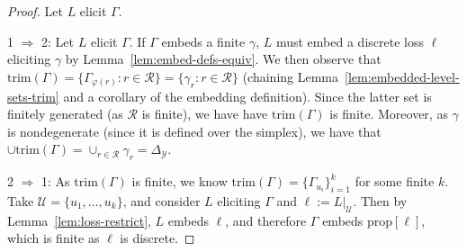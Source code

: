 \documentclass[12pt]{article}
\newcommand{\Comments}{1}
\newcommand{\mynote}[2]{\ifnum\Comments=1\textcolor{#1}{#2}\fi}
\newcommand{\jessie}[1]{\mynote{purple}{[JF: #1]}}
\newcommand{\reals}{\mathbb{R}}
\newcommand{\prop}[1]{\mathrm{prop}[#1]}
\newcommand{\simplex}{\Delta_\Y}
\newcommand{\R}{\mathcal{R}}
\newcommand{\U}{\mathcal{U}}
\newcommand{\Y}{\mathcal{Y}}
\newcommand{\risk}[1]{\underline{#1}}
\newcommand{\trim}{\mathrm{trim}}
\begin{document}
\begin{proof}
	Let $L$ elicit $\Gamma$.
	
	1 $\Rightarrow$ 2:
        Let $L$ elicit $\Gamma$.  
        If $\Gamma$ embeds a finite $\gamma$, $L$ must embed a discrete loss $\ell$ eliciting $\gamma$ by Lemma~\ref{lem:embed-defs-equiv}. 		
        We then observe that $\trim(\Gamma) = \{\Gamma_{\varphi(r)} : r \in \R \} = \{\gamma_r : r \in \R\}$ (chaining Lemma~\ref{lem:embedded-level-sets-trim} and a corollary of the embedding definition).
        Since the latter set is finitely generated (as $\R$ is finite), we have have $\trim(\Gamma)$ is finite.  
        Moreover, as $\gamma$ is nondegenerate (since it is defined over the simplex), we have that $\cup \trim(\Gamma) = \cup_{r \in \R} \gamma_r = \simplex$.

	2 $\Rightarrow$ 1:
	As $\trim(\Gamma)$ is finite, we know $\trim(\Gamma) = \{\Gamma_{u_i}\}_{i=1}^k$ for some finite $k$.
	Take $\U = \{u_1, \ldots, u_k\}$, and consider $L$ eliciting $\Gamma$ and $\ell := L|_{\U}$.  
	Then by Lemma~\ref{lem:loss-restrict}, $L$ embeds $\ell$, and therefore $\Gamma$ embeds $\prop{\ell}$, which is finite as $\ell$ is discrete.
	
%	


\end{proof}
\end{document}
